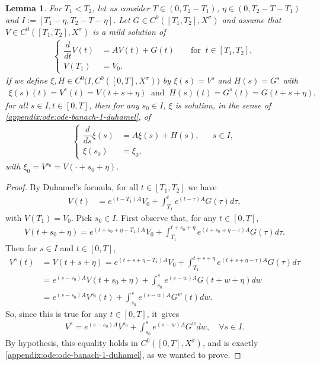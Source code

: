 \documentclass[JEP,XML,SOM,Unicode,published]{cedram}
\newtheorem{lemma}[theorem]{Lemma}
\theoremstyle{definition}
\begin{document}
\begin{lemma}\label{lmtranslat}
For $T_1<T_2$, let us consider $T\in (0, T_2-T_1)$, $\eta\in (0, T_2-T-T_1)$ and $I:=[T_1-\eta, T_2-T-\eta]$. Let $G\in C^{0}([T_{1},T_{2}],X^{\sigma})$ and assume that $V\in C^{0}([T_{1},T_{2}],X^{\sigma})$ is a mild solution of
\begin{align*}
\left\{\begin{aligned}
\dfrac{d}{dt}V(t)&=A V(t)+G(t) &&\text{ for }\ t\in [T_1, T_2],\\
V(T_1)&=V_0. &
\end{aligned}\right.
\end{align*}
If we define $\xi,H\in C^{0}\bigl(I, C^{0}([0,T],X^{\sigma})\bigr)$ by $\xi(s)=V^s$ and $H(s)=G^s$ with
\begin{align*}
\xi(s)(t)=V^{s}(t)=V(t+s+\eta)\ \text{ and }\ H(s)(t)=G^{s}(t)=G(t+s+\eta),
\end{align*}
for all $s\in I, t\in [0,T]$, then for any $s_0\in I$, $\xi$ is solution, in the sense of \eqref{appendix:ode:ode-banach-1-duhamel}, of
\begin{align*}
\left\{\begin{aligned}
\dfrac{d}{ds}\xi(s)&=A \xi(s)+H(s), && s\in I, \\
\xi(s_0)&=\xi_0, &
\end{aligned}\right.
\end{align*}
with $\xi_0=V^{s_0}=V(\cdot+s_0+\eta)$.
\end{lemma}
\begin{proof}
By Duhamel's formula, for all $t\in [T_1, T_2]$ we have
\begin{align*}
V(t)&=e^{(t-T_1)A}V_{0}+\int_{T_1}^{t}e^{(t-\tau)A}G(\tau)d\tau,
\end{align*}
with $V(T_1)=V_0$. Pick $s_0\in I$. First observe that, for any $t\in [0, T]$,
\begin{align*}
V(t+s_0+\eta)=e^{(t+s_0+\eta-T_1)A}V_{0}+\int_{T_1}^{t+s_0+\eta}e^{(t+s_0+\eta-\tau)A}G(\tau)d\tau.
\end{align*}
Then for $s\in I$ and $t\in [0, T]$,
\begin{align*}
V^{s}(t)&=V(t+s+\eta)=e^{(t+s+\eta-T_1)A}V_{0}+\int_{T_1}^{t+s+\eta}e^{(t+s+\eta-\tau)A}G(\tau)d\tau\\
&=e^{(s-s_0)A}V(t+s_0+\eta)+\int_{s_0}^{s}e^{(s-w)A}G(t+w+\eta)dw\\
&=e^{(s-s_0)A}V^{s_0}(t)+\int_{s_0}^{s}e^{(s-w)A}G^{w}(t)dw.
\end{align*}
So, since this is true for any $t\in [0,T]$, it~gives
\begin{align*}
V^{s}=e^{(s-s_0)A}V^{s_0}+\int_{s_0}^{s}e^{(s-w)A}G^{w}dw,\quad \forall s\in I.
\end{align*}
By hypothesis, this equality holds in $C^0([0, T], X^\sigma)$, and is exactly \eqref{appendix:ode:ode-banach-1-duhamel}, as we wanted to prove.
\end{proof}
\end{document}
